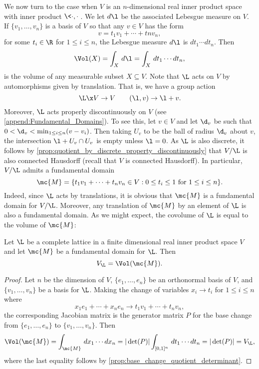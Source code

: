     We now turn to the case when $V$ is an $n$-dimensional real inner product space with inner product $\<\cdot,\cdot\>$. We let $d\l$ be the associated Lebesgue measure on $V$. If $\{v_{1},\ldots,v_{n}\}$ is a basis of $V$ so that any $v \in V$ has the form
    \[
      v = t_{1}v_{1}+\cdots+t{n}v_{n},
    \]
    for some $t_{i} \in \R$ for $1 \le i \le n$, the Lebesgue measure $d\l$ is $dt_{1} \cdots dt_{n}$. Then
    \[
      \Vol(X) = \int_{X}\,d\l = \int_{X}\,dt_{1} \cdots dt_{n},
    \]
    is the volume of any measurable subset $X \subseteq V$. Note that $\L$ acts on $V$ by automorphisms given by translation. That is, we have a group action
    \[
      \L \x V \to V \qquad (\l,v) \to \l+v.
    \]
    Moreover, $\L$ acts properly discontinuously on $V$ (see \cref{append:Fundamental_Domains}). To see this, let $v \in V$ and let $\d_{v}$ be such that $0 < \d_{v} < \min_{1 \le i \le n}(v-v_{i})$. Then taking $U_{v}$ to be the ball of radius $\d_{v}$ about $v$, the intersection $\l+U_{v} \cap U_{v}$ is empty unless $\l = 0$. As $\L$ is also discrete, it follows by \cref{prop:quotient_by_discrete_property_discontinuously} that $V/\L$ is also connected Hausdorff (recall that $V$ is connected Hausdorff). In particular, $V/\L$ admits a fundamental domain
    \[
      \mc{M} = \{t_{1}v_{1}+\cdots+t_{n}v_{n} \in V:\text{$0 \le t_{i} \le 1$ for $1 \le i \le n$}\}.
    \]
    Indeed, since $\L$ acts by translations, it is obvious that $\mc{M}$ is a fundamental domain for $V/\L$. Moreover, any translation of $\mc{M}$ by an element of $\L$ is also a fundamental domain. As we might expect, the covolume of $\L$ is equal to the volume of $\mc{M}$:

    \begin{proposition}\label{prop:covolume_equals_volume_of_fundamental_domain}
      Let $\L$ be a complete lattice in a finite dimensional real inner product space $V$ and let $\mc{M}$ be a fundamental domain for $\L$. Then
      \[
        V_{\L} = \Vol(\mc{M}).
      \]
    \end{proposition}
    \begin{proof}
      Let $n$ be the dimension of $V$, $\{e_{1},\ldots,e_{n}\}$ be an orthonormal basis of $V$, and $\{v_{1},\ldots,v_{n}\}$ be a basis for $\L$. Making the change of variables $x_{i} \to t_{i}$ for $1 \le i \le n$ where
      \[
        x_{1}e_{1}+\cdots+x_{n}e_{n} \to t_{1}v_{1}+\cdots+t_{n}v_{n},
      \]
      the corresponding Jacobian matrix is the generator matrix $P$ for the base change from $\{e_{1},\ldots,e_{n}\}$ to $\{v_{1},\ldots,v_{n}\}$. Then
      \[
        \Vol(\mc{M}) = \int_{\mc{M}}\,dx_{1} \cdots dx_{n} = |\det(P)|\int_{[0,1]^{n}}\,dt_{1} \cdots dt_{n} = |\det(P)| = V_{\L},
      \]
      where the last equality follows by \cref{prop:base_change_quotient_determinant}.
    \end{proof}

